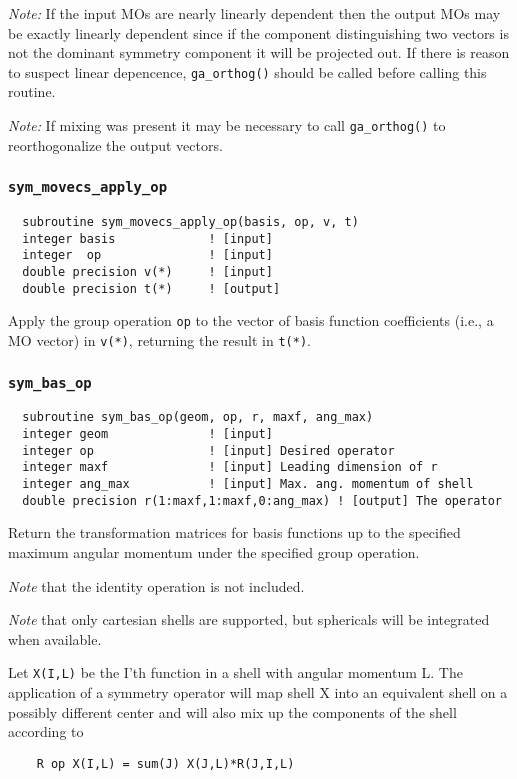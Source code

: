 {\em Note:} If the input MOs are nearly linearly dependent then the
output MOs may be exactly linearly dependent since if the component
distinguishing two vectors is not the dominant symmetry component it
will be projected out.  If there is reason to suspect linear depencence,
\verb+ga_orthog()+ should be called  before
calling this routine.

{\em Note:} If mixing was present it may be necessary to call
\verb+ga_orthog()+ to reorthogonalize the output vectors.

\subsubsection{{\tt sym\_movecs\_apply\_op}}
\begin{verbatim}
  subroutine sym_movecs_apply_op(basis, op, v, t)
  integer basis             ! [input]
  integer  op               ! [input]
  double precision v(*)     ! [input]
  double precision t(*)     ! [output]
\end{verbatim}
Apply the group operation \verb+op+ to the vector of basis function
coefficients (i.e., a MO vector) in \verb+v(*)+, returning the result
in \verb+t(*)+.

\subsubsection{{\tt sym\_bas\_op}}
\begin{verbatim}
  subroutine sym_bas_op(geom, op, r, maxf, ang_max)
  integer geom              ! [input]
  integer op                ! [input] Desired operator
  integer maxf              ! [input] Leading dimension of r
  integer ang_max           ! [input] Max. ang. momentum of shell
  double precision r(1:maxf,1:maxf,0:ang_max) ! [output] The operator
\end{verbatim}
Return the transformation matrices for basis functions up to the
specified maximum angular momentum under the specified group
operation.

{\em Note} that the identity operation is not included.

{\em Note} that only cartesian shells are supported, but sphericals
will be integrated when available.

Let \verb+X(I,L)+ be the I'th function in a shell with angular
momentum L.  The application of a symmetry operator will
map shell X into an equivalent shell on a possibly different
center and will also mix up the components of the shell
according to
\begin{verbatim}
    R op X(I,L) = sum(J) X(J,L)*R(J,I,L)
\end{verbatim}

